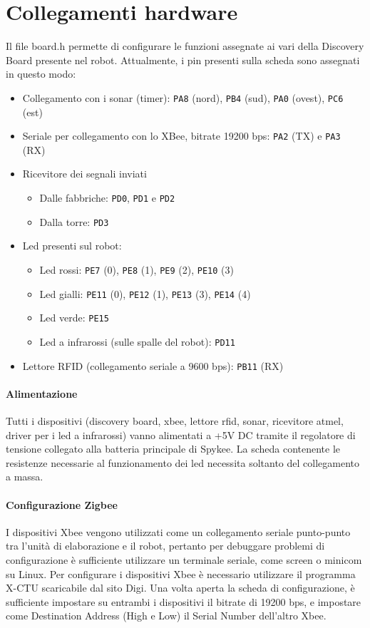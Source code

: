 \section{Collegamenti hardware}
Il file board.h permette di configurare le funzioni assegnate ai vari della Discovery Board presente nel robot. Attualmente, i pin presenti sulla scheda sono assegnati in questo modo:
\begin{itemize}
\item Collegamento con i sonar (timer): \verb|PA8| (nord), \verb|PB4| (sud), \verb|PA0| (ovest), \verb|PC6| (est)
\item Seriale per collegamento con lo XBee, bitrate 19200 bps: \verb|PA2| (TX) e \verb|PA3| (RX)
\item Ricevitore dei segnali inviati
	\begin{itemize}
	\item Dalle fabbriche: \verb|PD0|, \verb|PD1| e \verb|PD2|
	\item Dalla torre: \verb|PD3|
	\end{itemize}
\item Led presenti sul robot:
	\begin{itemize}
	\item Led rossi: \verb|PE7| (0), \verb|PE8| (1), \verb|PE9| (2), \verb|PE10| (3)
	\item Led gialli: \verb|PE11| (0), \verb|PE12| (1), \verb|PE13| (3), \verb|PE14| (4)
	\item Led verde: \verb|PE15|
	\item Led a infrarossi (sulle spalle del robot): \verb|PD11|
	\end{itemize}
\item Lettore RFID (collegamento seriale a 9600 bps): \verb|PB11| (RX)
\end{itemize}

\paragraph{Alimentazione} Tutti i dispositivi (discovery board, xbee, lettore rfid, sonar, ricevitore atmel, driver per i led a infrarossi) vanno alimentati a +5V DC tramite il regolatore di tensione collegato alla batteria principale di Spykee. La scheda contenente le resistenze necessarie al funzionamento dei led necessita soltanto del collegamento a massa.

\paragraph{Configurazione Zigbee} I dispositivi Xbee vengono utilizzati come un collegamento seriale punto-punto tra l’unità di elaborazione e il robot, pertanto per debuggare problemi di configurazione è sufficiente utilizzare un terminale seriale, come screen o minicom su Linux. Per configurare i dispositivi Xbee è necessario utilizzare il programma X-CTU scaricabile dal sito Digi. Una volta aperta la scheda di configurazione, è sufficiente impostare su entrambi i dispositivi il bitrate di 19200 bps, e impostare come Destination Address (High e Low) il Serial Number dell’altro Xbee.
